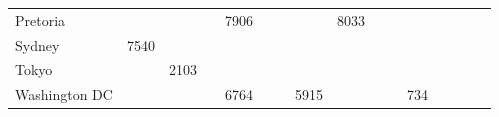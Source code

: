 \begin{tabular}{l|lllllllllllllll}
Pretoria      &         &         &        & 7906     &               &      &        & 8033   &        &           &        &          &        &       &               \\[4pt]
Sydney        & 7540    &         &        &          &               &      &        &        &        &           &        &          &        &       &               \\[4pt]
Tokyo         &         & 2103    &        &          &               &      &        &        &        &           &        &          &        &       &               \\[4pt]
Washington DC &         &         &        & 6764     &               &      & 5915   &        &        &           & 734    &          &        &       &               \\\hline
\end{tabular}
